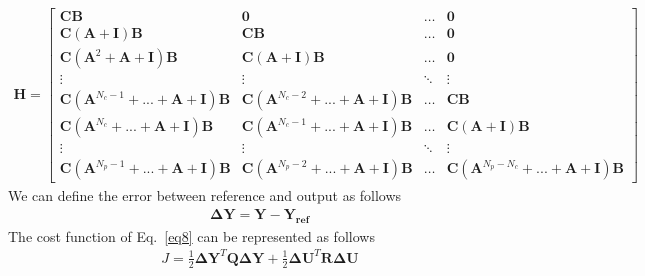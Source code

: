 \documentclass[11pt,a4paper,oneside]{book}
\numberwithin{equation}{section}
\theoremstyle{it}
\theoremstyle{definition}
\begin{document}
\begin{equation}\label{eq17}
	\begin{aligned}
		\mathbf{H}= \begin{bmatrix}
			\mathbf{C}\mathbf{B} & \mathbf{0} & \dots & \mathbf{0}  \\[6pt]
			\mathbf{C}\left(\mathbf{A}+\mathbf{I}\right) \mathbf{B} & 
			\mathbf{C}\mathbf{B} & \dots & \mathbf{0} \\[6pt]
			\mathbf{C}\left(\mathbf{A}^2+\mathbf{A}+\mathbf{I}\right) 
			\mathbf{B} & \mathbf{C}\left(\mathbf{A}+\mathbf{I}\right)\mathbf{B} 
			& \dots & \mathbf{0} \\[6pt]
			\vdots & \vdots & \ddots  & \vdots \\[6pt]
			\mathbf{C}\left(\mathbf{A}^{N_c-1}+...+\mathbf{A}+\mathbf{I}\right) 
			\mathbf{B} & 
			\mathbf{C}\left(\mathbf{A}^{N_c-2}+...+\mathbf{A}+\mathbf{I}\right) 
			\mathbf{B} & \dots & \mathbf{C}\mathbf{B} \\[6pt]
			\mathbf{C}\left(\mathbf{A}^{N_c}+...+\mathbf{A}+\mathbf{I}\right) 
			\mathbf{B} & 
			\mathbf{C}\left(\mathbf{A}^{N_c-1}+...+\mathbf{A}+\mathbf{I}\right) 
			\mathbf{B} & \dots & \mathbf{C}\left(\mathbf{A}+\mathbf{I}\right) 
			\mathbf{B} \\[6pt]
			\vdots & \vdots & \ddots  & \vdots \\[6pt]
			\mathbf{C}\left(\mathbf{A}^{N_p-1}+...+\mathbf{A}+\mathbf{I}\right) 
			\mathbf{B} & 
			\mathbf{C}\left(\mathbf{A}^{N_p-2}+...+\mathbf{A}+\mathbf{I}\right) 
			\mathbf{B} & \dots &
			\mathbf{C}\left(\mathbf{A}^{N_p-N_c}+...+\mathbf{A}+\mathbf{I}\right)
			 \mathbf{B}
		\end{bmatrix}
	\end{aligned}
\end{equation}
We can define the error between reference and output as follows 
\begin{equation}\label{eq18}
	\begin{aligned}
		\mathbf{\Delta Y} = \mathbf{Y}-\mathbf{Y_{ref}}
	\end{aligned}
\end{equation}
The cost function of Eq.~\eqref{eq8} can be represented as follows
\begin{equation}\label{eq19}
	\begin{aligned}
		J = \frac{1}{2}\mathbf{\Delta Y}^T\mathbf{Q}\mathbf{\Delta Y} + 
		\frac{1}{2} \mathbf{\Delta U}^T\mathbf{R}\mathbf{\Delta U}
	\end{aligned}
\end{equation}
\end{document}
